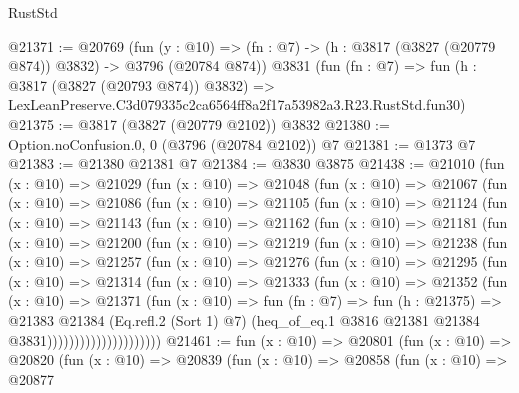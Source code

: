 \begin{lexlean}{RustStd}
\begin{coremodule}
@21371 := @20769
    (fun (y : @10) => (fn : @7) -> (h : @3817 (@3827 (@20779 @874)) @3832) -> @3796 (@20784 @874))
    @3831
    (fun (fn : @7) =>
    fun (h : @3817 (@3827 (@20793 @874)) @3832) =>
    LexLeanPreserve.C3d079335c2ca6564ff8a2f17a53982a3.R23.RustStd.fun30)
@21375 := @3817 (@3827 (@20779 @2102)) @3832
@21380 := Option.noConfusion.{0, 0} (@3796 (@20784 @2102)) @7
@21381 := @1373 @7
@21383 := @21380 @21381 @7
@21384 := @3830 @3875
@21438 := @21010
    (fun (x : @10) =>
    @21029
      (fun (x : @10) =>
      @21048
        (fun (x : @10) =>
        @21067
          (fun (x : @10) =>
          @21086
            (fun (x : @10) =>
            @21105
              (fun (x : @10) =>
              @21124
                (fun (x : @10) =>
                @21143
                  (fun (x : @10) =>
                  @21162
                    (fun (x : @10) =>
                    @21181
                      (fun (x : @10) =>
                      @21200
                        (fun (x : @10) =>
                        @21219
                          (fun (x : @10) =>
                          @21238
                            (fun (x : @10) =>
                            @21257
                              (fun (x : @10) =>
                              @21276
                                (fun (x : @10) =>
                                @21295
                                  (fun (x : @10) =>
                                  @21314
                                    (fun (x : @10) =>
                                    @21333
                                      (fun (x : @10) =>
                                      @21352
                                        (fun (x : @10) =>
                                        @21371
                                          (fun (x : @10) =>
                                          fun (fn : @7) =>
                                          fun (h : @21375) =>
                                          @21383
                                            @21384
                                            (Eq.refl.{2} (Sort 1) @7)
                                            (heq_of_eq.{1}
                                              @3816
                                              @21381
                                              @21384
                                              @3831)))))))))))))))))))))
@21461 := fun (x : @10) =>
  @20801
    (fun (x : @10) =>
    @20820
      (fun (x : @10) =>
      @20839
        (fun (x : @10) =>
        @20858
          (fun (x : @10) =>
          @20877

\end{coremodule}
\end{lexlean}
